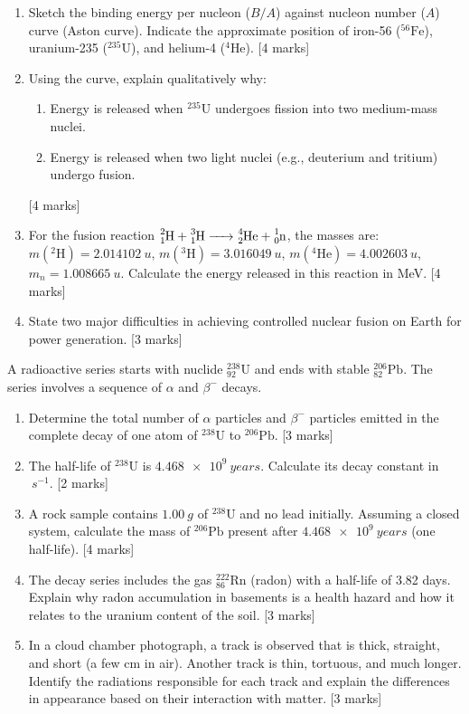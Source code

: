 \documentclass[11pt]{article}
\begin{document}
\begin{exercice}
\begin{enumerate}
    \item Sketch the binding energy per nucleon ($B/A$) against nucleon number ($A$) curve (Aston curve). Indicate the approximate position of iron-56 ($^{56}\text{Fe}$), uranium-235 ($^{235}\text{U}$), and helium-4 ($^{4}\text{He}$). [4 marks]
    \item Using the curve, explain qualitatively why:
    \begin{enumerate}
        \item Energy is released when $^{235}\text{U}$ undergoes fission into two medium-mass nuclei.
        \item Energy is released when two light nuclei (e.g., deuterium and tritium) undergo fusion.
    \end{enumerate} [4 marks]
    \item For the fusion reaction $\ce{^{2}_{1}H + ^{3}_{1}H -> ^{4}_{2}He + ^{1}_{0}n}$, the masses are:
    $m(^{2}\text{H}) = \SI{2.014102}{u}$, $m(^{3}\text{H}) = \SI{3.016049}{u}$, $m(^{4}\text{He}) = \SI{4.002603}{u}$, $m_n = \SI{1.008665}{u}$.
    Calculate the energy released in this reaction in MeV. [4 marks]
    \item State two major difficulties in achieving controlled nuclear fusion on Earth for power generation. [3 marks]
\end{enumerate}
\end{exercice}

\begin{exercice}
A radioactive series starts with nuclide $^{238}_{92}\text{U}$ and ends with stable $^{206}_{82}\text{Pb}$. The series involves a sequence of $\alpha$ and $\beta^{-}$ decays.
\begin{enumerate}
    \item Determine the total number of $\alpha$ particles and $\beta^{-}$ particles emitted in the complete decay of one atom of $^{238}\text{U}$ to $^{206}\text{Pb}$. [3 marks]
    \item The half-life of $^{238}\text{U}$ is $\SI{4.468e9}{years}$. Calculate its decay constant in $\SI{}{s^{-1}}$. [2 marks]
    \item A rock sample contains $\SI{1.00}{g}$ of $^{238}\text{U}$ and no lead initially. Assuming a closed system, calculate the mass of $^{206}\text{Pb}$ present after $\SI{4.468e9}{years}$ (one half-life). [4 marks]
    \item The decay series includes the gas $^{222}_{86}\text{Rn}$ (radon) with a half-life of 3.82 days. Explain why radon accumulation in basements is a health hazard and how it relates to the uranium content of the soil. [3 marks]
    \item In a cloud chamber photograph, a track is observed that is thick, straight, and short (a few cm in air). Another track is thin, tortuous, and much longer. Identify the radiations responsible for each track and explain the differences in appearance based on their interaction with matter. [3 marks]
\end{enumerate}
\end{exercice}
\end{document}
